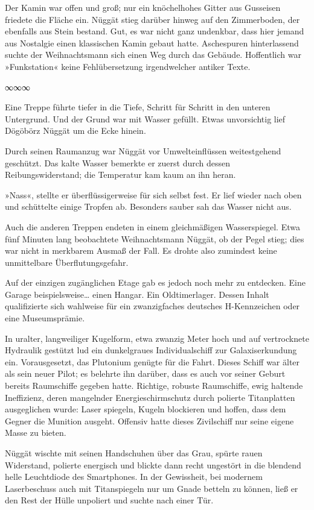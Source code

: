 Der Kamin war offen und groß; nur ein knöchelhohes Gitter aus Gusseisen friedete die Fläche ein. Nüggät stieg darüber hinweg auf den Zimmerboden, der ebenfalls aus Stein bestand. Gut, es war nicht ganz undenkbar, dass hier jemand aus Nostalgie einen klassischen Kamin gebaut hatte. Aschespuren hinterlassend suchte der Weihnachtsmann sich einen Weg durch das Gebäude. Hoffentlich war »Funkstation« keine Fehlübersetzung irgendwelcher antiker Texte.

\begin{center}
∞∞∞
\end{center}

Eine Treppe führte tiefer in die Tiefe, Schritt für Schritt in den unteren Untergrund. Und der Grund war mit Wasser gefüllt. Etwas unvorsichtig lief Dögöbörz Nüggät um die Ecke hinein.

Durch seinen Raumanzug war Nüggät vor Umwelteinflüssen weitestgehend geschützt. Das kalte Wasser bemerkte er zuerst durch dessen Reibungswiderstand; die Temperatur kam kaum an ihn heran.

»Nass«, stellte er überflüssigerweise für sich selbst fest. Er lief wieder nach oben und schüttelte einige Tropfen ab. Besonders sauber sah das Wasser nicht aus.

Auch die anderen Treppen endeten in einem gleichmäßigen Wasserspiegel. Etwa fünf Minuten lang beobachtete Weihnachtsmann Nüggät, ob der Pegel stieg; dies war nicht in merkbarem Ausmaß der Fall. Es drohte also zumindest keine unmittelbare Überflutungsgefahr.

Auf der einzigen zugänglichen Etage gab es jedoch noch mehr zu entdecken. Eine Garage beispielsweise… einen Hangar. Ein Oldtimerlager. Dessen Inhalt qualifizierte sich wahlweise für ein zwanzigfaches deutsches H-Kennzeichen oder eine Museumsprämie.

In uralter, langweiliger Kugelform, etwa zwanzig Meter hoch und auf vertrocknete Hydraulik gestützt lud ein dunkelgraues Individualschiff zur Galaxiserkundung ein. Vorausgesetzt, das Plutonium genügte für die Fahrt. Dieses Schiff war älter als sein neuer Pilot; es belehrte ihn darüber, dass es auch vor seiner Geburt bereits Raumschiffe gegeben hatte. Richtige, robuste Raumschiffe, ewig haltende Ineffizienz, deren mangelnder Energieschirmschutz durch polierte Titanplatten ausgeglichen wurde: Laser spiegeln, Kugeln blockieren und hoffen, dass dem Gegner die Munition ausgeht. Offensiv hatte dieses Zivilschiff nur seine eigene Masse zu bieten.

Nüggät wischte mit seinen Handschuhen über das Grau, spürte rauen Widerstand, polierte energisch und blickte dann recht ungestört in die blendend helle Leuchtdiode des Smartphones. In der Gewissheit, bei modernem Laserbeschuss auch mit Titanspiegeln nur um Gnade betteln zu können, ließ er den Rest der Hülle unpoliert und suchte nach einer Tür.

